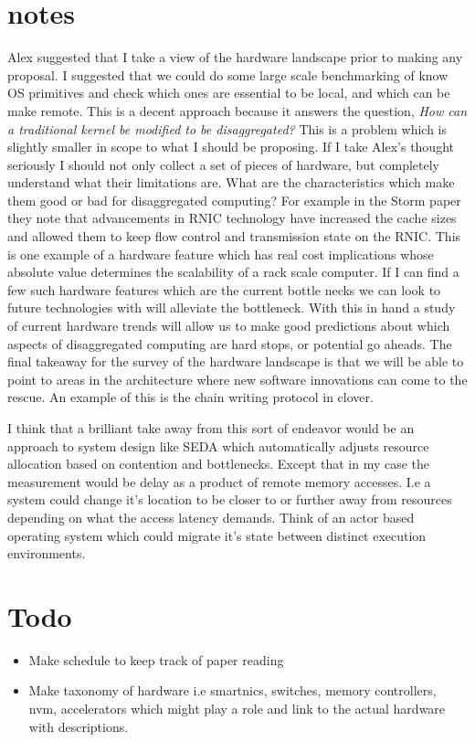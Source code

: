 \section{notes}
\label{sec:thoughts}

Alex suggested that I take a view of the hardware landscape prior to making
any proposal. I suggested that we could do some large scale benchmarking of
know OS primitives and check which ones are essential to be local, and which
can be make remote. This is a decent approach because it answers the
question, \textit{How can a traditional kernel be modified to be
disaggregated?} This is a problem which is slightly smaller in scope to what
I should be proposing. If I take Alex's thought seriously I should not only
collect a set of pieces of hardware, but completely understand what their
limitations are. What are the characteristics which make them good or bad for
disaggregated computing? For example in the Storm paper~\cite{storm} they
note that advancements in RNIC technology have increased the cache sizes and
allowed them to keep flow control and transmission state on the RNIC. This is
one example of a hardware feature which has real cost implications whose
absolute value determines the scalability of a rack scale computer. If I can
find a few such hardware features which are the current bottle necks we can
look to future technologies with will alleviate the bottleneck. With this in
hand a study of current hardware trends will allow us to make good
predictions about which aspects of disaggregated computing are hard stops, or
potential go aheads. The final takeaway for the survey of the hardware
landscape is that we will be able to point to areas in the architecture where
new software innovations can come to the rescue. An example of this is the
chain writing protocol in clover.

I think that a brilliant take away from this sort of endeavor would be an
approach to system design like SEDA which automatically adjusts resource
allocation based on contention and bottlenecks. Except that in my case the
measurement would be delay as a product of remote memory accesses. I.e a
system could change it's location to be closer to or further away from
resources depending on what the access latency demands. Think of an actor
based operating system which could migrate it's state between distinct
execution environments.

\section{Todo} 
\label{sec:todo}
\begin{itemize} 

     \item{Make schedule to keep track of paper reading}

    \item {Make taxonomy of hardware i.e smartnics, switches, memory
    controllers, nvm, accelerators which might play a role and link to the
    actual hardware with descriptions.}

\end{itemize}

